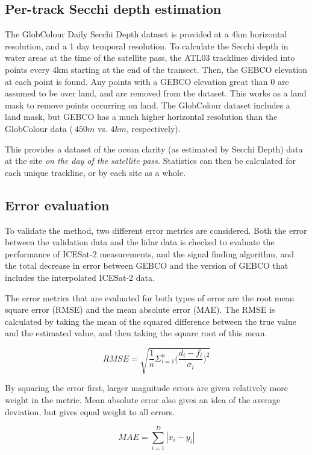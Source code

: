 \subsection{Per-track Secchi depth estimation}

The GlobColour Daily Secchi Depth dataset is provided at a 4km horizontal resolution, and a 1 day temporal resolution. To calculate the Secchi depth in water areas at the time of the satellite pass, the ATL03 tracklines divided into points every 4km starting at the end of the transect. Then, the GEBCO elevation at each point is found. Any points with a GEBCO elevation great than 0 are assumed to be over land, and are removed from the dataset. This works as a land mask to remove points occurring on land. The GlobColour dataset includes a land mask, but GEBCO has a much higher horizontal resolution than the GlobColour data ($~450m$ vs. $4km$, respectively). 

This provides a dataset of the ocean clarity (as estimated by Secchi Depth) data at the site \emph{on the day of the satellite pass.} Statistics can then be calculated for each unique trackline, or by each site as a whole.


\subsection{Error evaluation}

To validate the method, two different error metrics are considered. Both the error between the validation data and the lidar data is checked to evaluate the performance of ICESat-2 measurements, and the signal finding algorithm, and the total decrease in error between GEBCO and the version of GEBCO that includes the interpolated ICESat-2 data. 

The error metrics that are evaluated for both types of error are the root mean square error (RMSE) and the mean absolute error (MAE). The RMSE is calculated by taking the mean of the squared difference between the true value and the estimated value, and then taking the square root of this mean.

$$  RMSE = \sqrt{\frac{1}{n}\Sigma_{i=1}^{n}{\Big(\frac{d_i -f_i}{\sigma_i}\Big)^2}}  $$

By squaring the error first, larger magnitude errors are given relatively more weight in the metric. Mean absolute error also gives an idea of the average deviation, but gives equal weight to all errors.

$$ MAE = \sum_{i=1}^{D}|x_i-y_i| $$


